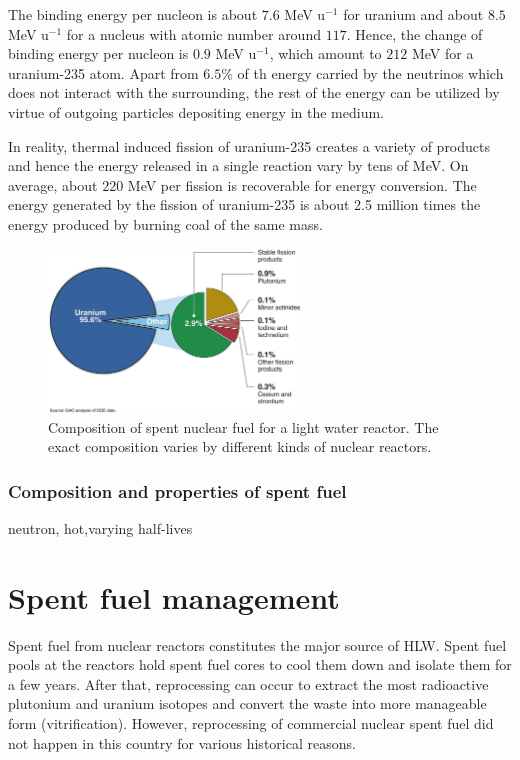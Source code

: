 \documentclass[nofootinbib,preprint,aps]{revtex4-1}
\begin{document}
        The binding energy per nucleon is about $7.6$ MeV u${}^{-1}$ for uranium and about $8.5$ MeV u${}^{-1}$
        for a nucleus with atomic number around $117$. Hence, the change of binding energy per nucleon is
        $0.9$ MeV u${}^{-1}$, which amount to $212$ MeV for a uranium-235 atom.
        Apart from $6.5\%$ of th energy carried by the neutrinos which does not interact with the surrounding,
        the rest of the energy can be utilized by virtue of outgoing particles depositing energy in the medium.

        In reality, thermal induced fission of uranium-235 creates a variety of products and hence the energy released
        in a single reaction vary by tens of MeV. On average, about $220$ MeV per fission is recoverable for energy conversion.
        The energy generated by the fission of uranium-235 is 
        about 2.5 million times the energy produced by burning coal of the same mass.\cite{e17}

        \begin{figure}[h]
            \centering
            \includegraphics[width=0.6\textwidth]{spent-fuel.png}
            \caption{Composition of spent nuclear fuel for a light water reactor. The exact composition varies
            by different kinds of nuclear reactors.}
            \label{fig:spentfuel}
        \end{figure}
        \subsubsection{Composition and properties of spent fuel}
        neutron, hot,varying half-lives
    \section{Spent fuel management}
    \label{sec:temp}
    Spent fuel from nuclear reactors constitutes the major source of HLW. Spent fuel pools at the
    reactors hold spent fuel cores to cool them down and isolate them for a few years. After that,
    reprocessing can occur to extract the most radioactive plutonium and uranium isotopes and
    convert the waste into more manageable form (vitrification). However, reprocessing of commercial
    nuclear spent fuel did not
    happen in this country for various historical reasons. 
\end{document}
